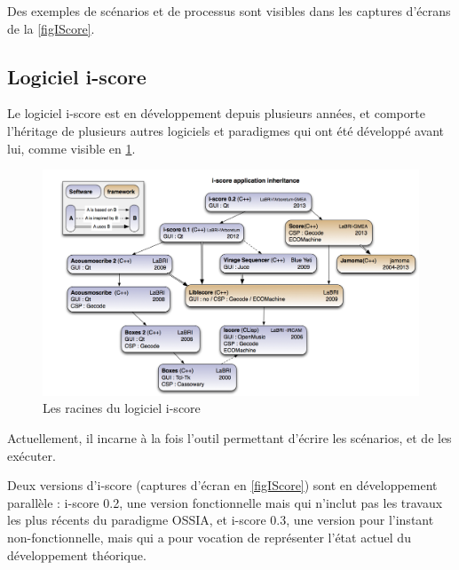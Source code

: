 Des exemples de scénarios et de processus sont visibles dans les captures d'écrans de la \cref{figIScore}.

\subsection{Logiciel i-score}
Le logiciel i-score est en développement depuis plusieurs années, et comporte l'héritage de plusieurs autres logiciels et paradigmes qui ont été développé avant lui, comme visible en \cref{figheritageIScore}.

\begin{figure}[H]
	\centering
	\includegraphics[scale=0.4]{images/iscoreHeritage.png}
	\caption{Les racines du logiciel i-score}
	\label{figheritageIScore}
\end{figure}

Actuellement, il incarne à la fois l'outil permettant d'écrire les scénarios, et de les exécuter.

Deux versions d'i-score (captures d'écran en \cref{figIScore}) sont en développement parallèle : i-score 0.2, une version fonctionnelle mais qui n'inclut pas les travaux les plus récents du paradigme \ac{OSSIA}, et i-score 0.3, une version pour l'instant non-fonctionnelle, mais qui a pour vocation de représenter l'état actuel du développement théorique.

